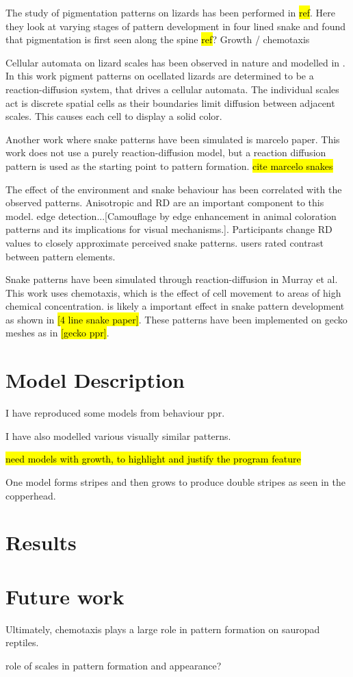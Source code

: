 The study of pigmentation patterns on lizards has been performed in \hl{ref}. Here they look at varying stages of pattern development in four lined snake and found that pigmentation is first seen along the spine \hl{ref}? Growth / chemotaxis 

Cellular automata on lizard scales has been observed in nature and modelled in \cite{}. In this work pigment patterns on ocellated lizards are determined to be a reaction-diffusion system, that drives a cellular automata. The individual scales act is discrete spatial cells as their boundaries limit diffusion between adjacent scales. This causes each cell to display a solid color.

Another work where snake patterns have been simulated is marcelo paper. This work does not use a purely reaction-diffusion model, but a reaction diffusion pattern is used as the starting point to pattern formation. \hl{cite marcelo snakes}

The effect of the environment and snake behaviour has been correlated with the observed patterns. Anisotropic and RD are an important component to this model. edge detection...[Camouflage by edge enhancement in animal coloration patterns and its implications for visual mechanisms.]. Participants change RD values to closely approximate perceived snake patterns. users rated contrast between pattern elements.

Snake patterns have been simulated through reaction-diffusion in Murray et al. This work uses chemotaxis, which is the effect of cell movement to areas of high chemical concentration. is likely a important effect in snake pattern development as shown in \hl{[4 line snake paper]}. These patterns have been implemented on gecko meshes as in \hl{[gecko ppr]}. 

\section{Model Description}
I have reproduced some models from behaviour ppr. 

I have also modelled various visually similar patterns.

\hl{need models with growth, to highlight and justify the program feature}

One model forms stripes and then grows to produce double stripes as seen in the copperhead.

\section{Results}

\section{Future work}
Ultimately, chemotaxis plays a large role in pattern formation on sauropad reptiles.

role of scales in pattern formation and appearance? 
